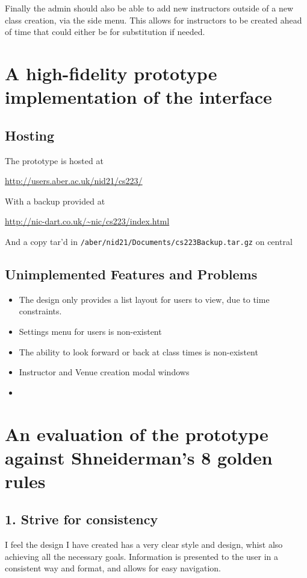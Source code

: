 \documentclass[10pt]{article}
\begin{document}
        Finally the admin should also be able to add new instructors outside of a new class creation, via the side menu. This allows for instructors to be created ahead of time that could either be for substitution if needed.

    \section{A high-fidelity prototype implementation of the interface}

      \subsection{Hosting}
        
        The prototype is hosted at 
        \begin{center}
          \url{http://users.aber.ac.uk/nid21/cs223/}
        \end{center}
        With a backup provided at
        \begin{center}
          \url{http://nic-dart.co.uk/~nic/cs223/index.html}
        \end{center}
        And a copy tar'd in \texttt{/aber/nid21/Documents/cs223Backup.tar.gz} on central

      \subsection{Unimplemented Features and Problems}
        \begin{itemize}
          \item The design only provides a list layout for users to view, due to time constraints.
          \item Settings menu for users is non-existent
          \item The ability to look forward or back at class times is non-existent
          \item Instructor and Venue creation modal windows
          \item 
        \end{itemize}
    
    \section{An evaluation of the prototype against Shneiderman’s 8 golden rules}
      \subsection{1. Strive for consistency}
        I feel the design I have created has a very clear style and design, whist also achieving all the necessary goals. Information is presented to the user in a consistent way and format, and allows for easy navigation.
\end{document}
